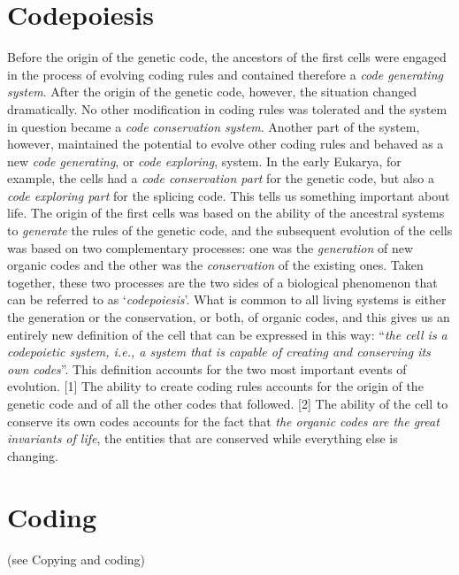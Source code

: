 \documentclass[12pt]{article}
\begin{document}
\section{Codepoiesis }
Before the origin of the genetic code, the ancestors of the first cells were engaged in the process of evolving coding rules and contained therefore a \textit{code generating system}. After the origin of the genetic code, however, the situation changed dramatically. No other modification in coding rules was tolerated and the system in question became a \textit{code conservation system}. Another part of the system, however, maintained the potential to evolve other coding rules and behaved as a new \textit{code generating}, or \textit{code exploring}, system. In the early Eukarya, for example, the cells had a \textit{code conservation part} for the genetic code, but also a \textit{code exploring part} for the splicing code. This tells us something important about life. The origin of the first cells was based on the ability of the ancestral systems to \textit{generate} the rules of the genetic code, and the subsequent evolution of the cells was based on two complementary processes: one was the \textit{generation} of new organic codes and the other was the \textit{conservation} of the existing ones. Taken together, these two processes are the two sides of a biological phenomenon that can be referred to as `\textit{codepoiesis}'. What is common to all living systems is either the generation or the conservation, or both, of organic codes, and this gives us an entirely new definition of the cell that can be expressed in this way: ``\textit{the cell is a codepoietic system, i.e., a system that is capable of creating and conserving its own codes}''. This definition accounts for the two most important events of evolution. [1] The ability to create coding rules accounts for the origin of the genetic code and of all the other codes that followed. [2] The ability of the cell to conserve its own codes accounts for the fact that \textit{the organic codes are the great invariants of life}, the entities that are conserved while everything else is changing. 


\section{Coding} (see Copying and coding)
\end{document}
